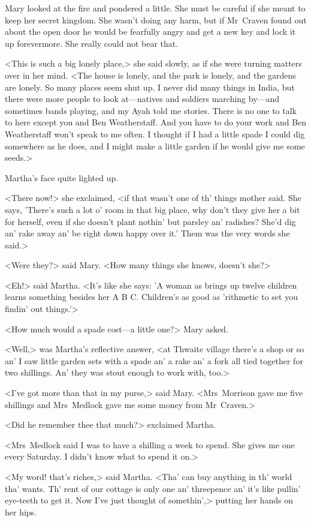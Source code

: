 Mary looked at the fire and pondered a little. She must be careful if she meant to keep her secret kingdom. She wasn't doing any harm, but if Mr~Craven found out about the open door he would be fearfully angry and get a new key and lock it up forevermore. She really could not bear that.

<This is such a big lonely place,> she said slowly, as if she were turning matters over in her mind. <The house is lonely, and the park is lonely, and the gardens are lonely. So many places seem shut up. I never did many things in India, but there were more people to look at—natives and soldiers marching by—and sometimes bands playing, and my Ayah told me stories. There is no one to talk to here except you and Ben Weatherstaff. And you have to do your work and Ben Weatherstaff won't speak to me often. I thought if I had a little spade I could dig somewhere as he does, and I might make a little garden if he would give me some seeds.>

Martha's face quite lighted up.

<There now!> she exclaimed, <if that wasn't one of th' things mother said. She says, 'There's such a lot o' room in that big place, why don't they give her a bit for herself, even if she doesn't plant nothin' but parsley an' radishes? She'd dig an' rake away an' be right down happy over it.' Them was the very words she said.>

<Were they?> said Mary. <How many things she knows, doesn't she?>

<Eh!> said Martha. <It's like she says: 'A woman as brings up twelve children learns something besides her A B C\@. Children's as good as 'rithmetic to set you findin' out things.'>

<How much would a spade cost—a little one?> Mary asked.

<Well,> was Martha's reflective answer, <at Thwaite village there's a shop or so an' I saw little garden sets with a spade an' a rake an' a fork all tied together for two shillings. An' they was stout enough to work with, too.>

<I've got more than that in my purse,> said Mary. <Mrs~Morrison gave me five shillings and Mrs~Medlock gave me some money from Mr~Craven.>

<Did he remember thee that much?> exclaimed Martha.

<Mrs~Medlock said I was to have a shilling a week to spend. She gives me one every Saturday. I didn't know what to spend it on.>

<My word! that's riches,> said Martha. <Tha' can buy anything in th' world tha' wants. Th' rent of our cottage is only one an' threepence an' it's like pullin' eye-teeth to get it. Now I've just thought of somethin',> putting her hands on her hips.

